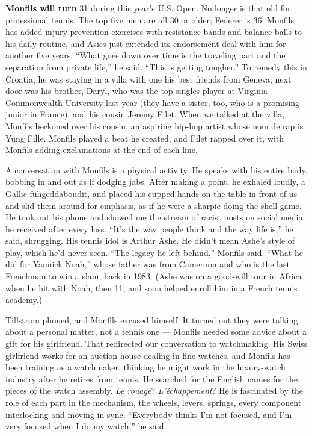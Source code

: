 \textbf{Monfils will turn} 31 during this year's U.S. Open. No longer is
that old for professional tennis. The top five men are all 30 or older;
Federer is 36. Monfils has added injury-prevention exercises with
resistance bands and balance balls to his daily routine, and Asics just
extended its endorsement deal with him for another five years. ``What
goes down over time is the traveling part and the separation from
private life,'' he said. ``This is getting tougher.'' To remedy this in
Croatia, he was staying in a villa with one his best friends from
Geneva; next door was his brother, Daryl, who was the top singles player
at Virginia Commonwealth University last year (they have a sister, too,
who is a promising junior in France), and his cousin Jeremy Filet. When
we talked at the villa, Monfils beckoned over his cousin, an aspiring
hip-hop artist whose nom de rap is Yung Fille. Monfils played a beat he
created, and Filet rapped over it, with Monfils adding exclamations at
the end of each line.

A conversation with Monfils is a physical activity. He speaks with his
entire body, bobbing in and out as if dodging jabs. After making a
point, he exhaled loudly, a Gallic fuhgeddaboudit, and placed his cupped
hands on the table in front of us and slid them around for emphasis, as
if he were a sharpie doing the shell game. He took out his phone and
showed me the stream of racist posts on social media he received after
every loss. ``It's the way people think and the way life is,'' he said,
shrugging. His tennis idol is Arthur Ashe. He didn't mean Ashe's style
of play, which he'd never seen. ``The legacy he left behind,'' Monfils
said. ``What he did for Yannick Noah,'' whose father was from Cameroon
and who is the last Frenchman to win a slam, back in 1983. (Ashe was on
a good-will tour in Africa when he hit with Noah, then 11, and soon
helped enroll him in a French tennis academy.)

Tillstrom phoned, and Monfils excused himself. It turned out they were
talking about a personal matter, not a tennis one --- Monfils needed
some advice about a gift for his girlfriend. That redirected our
conversation to watchmaking. His Swiss girlfriend works for an auction
house dealing in fine watches, and Monfils has been training as a
watchmaker, thinking he might work in the luxury-watch industry after he
retires from tennis. He searched for the English names for the pieces of
the watch assembly. \emph{Le rouage}? \emph{L'échappement}? He is
fascinated by the role of each part in the mechanism, the wheels,
levers, springs, every component interlocking and moving in sync.
``Everybody thinks I'm not focused, and I'm very focused when I do my
watch,'' he said.

